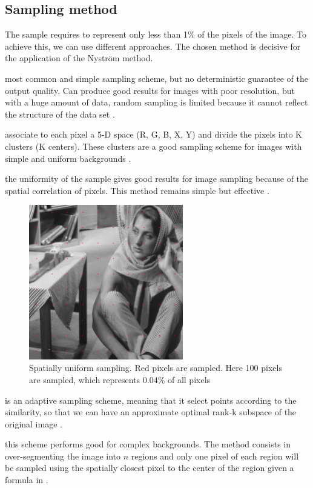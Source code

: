 \subsection{Sampling method}
\label{subsec:sampling-variations}
The sample requires to represent only less than 1\% of the pixels of the image. To achieve this, we can use different approaches. The chosen method is decisive for the application of the Nystr\"om method.
\begin{description}[align=left]
 \item [Random sampling (RS)] most common and simple sampling scheme, but no deterministic guarantee of the output quality. Can produce good results for images with poor resolution, but with a huge amount of data, random sampling is limited because it cannot reflect the structure of the data set \cite{zhan_improved_2017}.
 \item [K-means sampling (KS)] associate to each pixel a 5-D space (R, G, B, X, Y) and divide the pixels into K clusters (K centers). These clusters are a good sampling scheme for images with simple and uniform backgrounds \cite{kao_sampling_2012} \cite{zhang_improved_2008}.
 \item [Uniform spatially sampling] the uniformity of the sample gives good results for image sampling because of the spatial correlation of pixels. This method remains simple but effective \cite{glide_2014}.
  \begin{figure}[H]
      \centering
      \includegraphics[width=0.6\textwidth]{img/spatiallyUniformSampling.png}
      \caption{Spatially uniform sampling. Red pixels are sampled. Here 100 pixels are sampled, which represents 0.04\% of all pixels}
  \end{figure}
 \item [Incremental sampling (INS)] is an adaptive sampling scheme, meaning that it select points according to the similarity, so that we can have an approximate optimal rank-k subspace of the original image \cite{zhan_improved_2017}.
 \item [Mean-shift segmentation-based sampling] this scheme performs good for complex backgrounds. The method consists in over-segmenting the image into \(n\) regions and only one pixel of each region will be sampled using the spatially closest pixel to the center of the region given a formula in \cite{kao_sampling_2012}.
\end{description}

